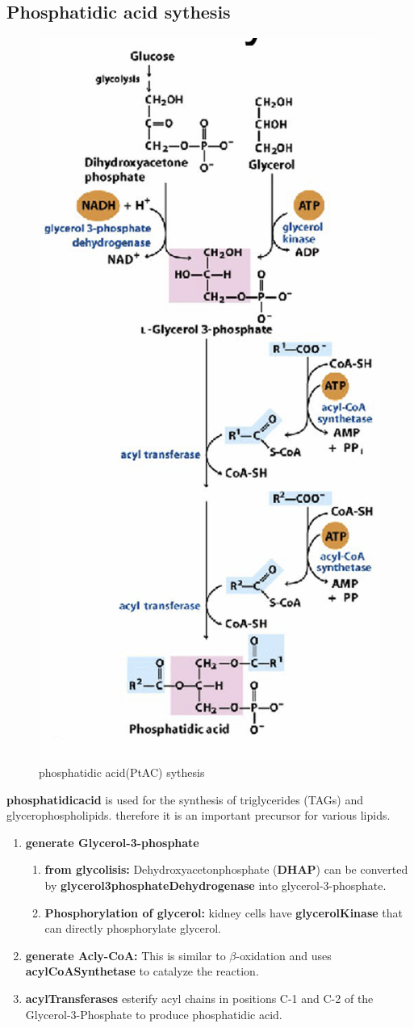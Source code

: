 \documentclass[../main.tex]{subfiles}
\begin{document}
\subsection{Phosphatidic acid sythesis}
\begin{figure}[H]
    \centering
    \includegraphics[width=0.25\linewidth]{phosphatidicAcid.png}
    \caption{phosphatidic acid(PtAC) sythesis}
    \label{fig:enter-label}
\end{figure}
\textbf{\gls{phosphatidicacid}} is used for the synthesis of triglycerides (TAGs) and glycerophospholipids. therefore it is an important precursor for various lipids. 
\begin{enumerate}
    \item \textbf{generate Glycerol-3-phosphate}
    \begin{enumerate}
        \item \textbf{from glycolisis:} Dehydroxyacetonphosphate (\textbf{DHAP}) can be converted by \textbf{\gls{glycerol3phosphateDehydrogenase}} into glycerol-3-phosphate.

        \item \textbf{Phosphorylation of glycerol:} kidney cells have \textbf{\gls{glycerolKinase}} that can directly phosphorylate glycerol.
    \end{enumerate}
    \item \textbf{generate Acly-CoA:} This is similar to $\beta$-oxidation and uses \textbf{\gls{acylCoASynthetase}} to catalyze the reaction.

    \item \textbf{\gls{acylTransferases}} esterify acyl chains in positions C-1 and C-2 of the Glycerol-3-Phosphate to produce phosphatidic acid.
\end{enumerate}
\end{document}
